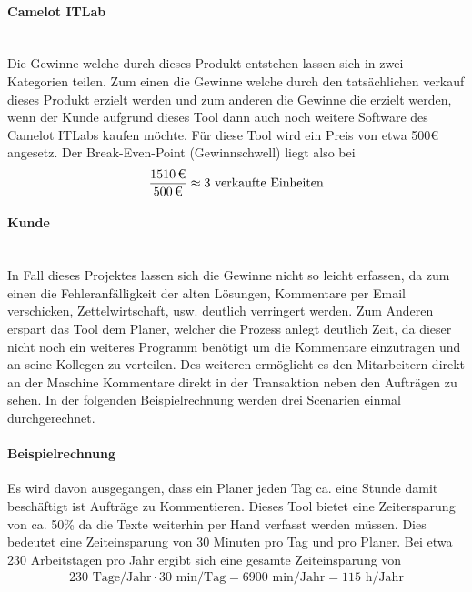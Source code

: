 \paragraph{Camelot ITLab}\mbox{} \\
Die Gewinne welche durch dieses Produkt entstehen lassen sich in zwei Kategorien teilen. Zum einen die Gewinne welche durch den tatsächlichen verkauf dieses Produkt erzielt werden und zum anderen die Gewinne die erzielt werden, wenn der Kunde aufgrund dieses Tool dann auch noch weitere Software des Camelot ITLabs kaufen möchte. Für diese Tool wird ein Preis von etwa 500€ angesetz. Der Break-Even-Point (Gewinnschwell) liegt also bei
\begin{eqnarray}
\frac{\eur{1510}}{\eur{500}} \approx 3 \mbox{ verkaufte Einheiten} 
\end{eqnarray}

\paragraph{Kunde}\mbox{} \\
In Fall dieses Projektes lassen sich die Gewinne nicht so leicht erfassen, da zum einen die Fehleranfälligkeit der alten Lösungen, Kommentare per Email verschicken, Zettelwirtschaft, usw. deutlich verringert werden. Zum Anderen erspart das Tool dem Planer, welcher die Prozess anlegt deutlich Zeit, da dieser nicht noch ein weiteres Programm benötigt um die Kommentare einzutragen und an seine Kollegen zu verteilen. Des weiteren ermöglicht es den Mitarbeitern direkt an der Maschine Kommentare direkt in der Transaktion neben den Aufträgen zu sehen. In der folgenden Beispielrechnung werden drei Scenarien einmal durchgerechnet. 

\paragraph{Beispielrechnung}
Es wird davon ausgegangen, dass ein Planer jeden Tag ca. eine Stunde damit beschäftigt ist Aufträge zu Kommentieren. Dieses Tool bietet eine Zeitersparung von ca. 50\% da die Texte weiterhin per Hand verfasst werden müssen. Dies bedeutet eine Zeiteinsparung von 30 Minuten pro Tag und pro Planer. Bei etwa 230 Arbeitstagen pro Jahr ergibt sich eine gesamte Zeiteinsparung von  
\begin{eqnarray}
230 \mbox{ Tage/Jahr} \cdot 30 \mbox{ min/Tag} = 6900 \mbox{ min/Jahr} = 115 \mbox{ h/Jahr} 
\end{eqnarray}

